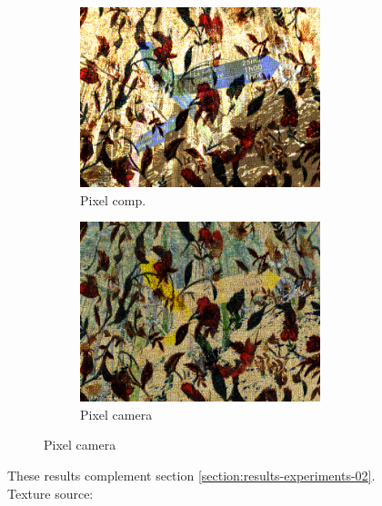 \begin{figure}[]
\begin{subfigure}{\textwidth}
\begin{subfigure}{0.24\textwidth}
            \includegraphics[width=\textwidth]{images/04-experiment02/photo/flowers2/pixel_im.jpg}
            \caption*{Pixel comp.}
        \end{subfigure}
        \hfill
        \begin{subfigure}{0.24\textwidth}
            \centering
            \includegraphics[width=\textwidth]{images/04-experiment02/photo/flowers2/pixel_proj.jpg}
            \caption*{Pixel camera}
        \end{subfigure}
    \end{subfigure}
    \caption{These results complement section \ref{section:results-experiments-02}. Texture source: \citet{Pixar128}}
    \label{fig:ex02-complete-photo-flowers_flowers2}
\end{figure}


